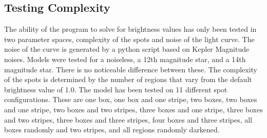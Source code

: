 

\subsection{Testing Complexity \label{complexity}}
The ability of the program to solve for brightness values has only been tested in two parameter spaces, complexity of the spots and noise of the light curve. The noise of the curve is generated by a python script based on Kepler Magnitude noises. Models were tested for a noiseless, a 12th magnitude star, and a 14th magnitude star. There is no noticeable difference between these.
The complexity of the spots is determined by the number of regions that vary from the default brightness value of 1.0. The model has been tested on 11 different spot configurations. These are one box, one box and one stripe, two boxes, two boxes and one stripe, two boxes and two stripes, three boxes and one stripe, three boxes and two stripes, three boxes and three stripes, four boxes and three stripes, all boxes randomly and two stripes, and all regions randomly darkened.